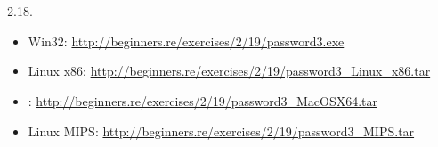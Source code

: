 \section{}

 2.18.

\begin{itemize}
\item Win32: \url{http://beginners.re/exercises/2/19/password3.exe}
\item Linux x86: \url{http://beginners.re/exercises/2/19/password3_Linux_x86.tar}
\item \MacOSX: \url{http://beginners.re/exercises/2/19/password3_MacOSX64.tar}
\item Linux MIPS: \url{http://beginners.re/exercises/2/19/password3_MIPS.tar}
\end{itemize}

